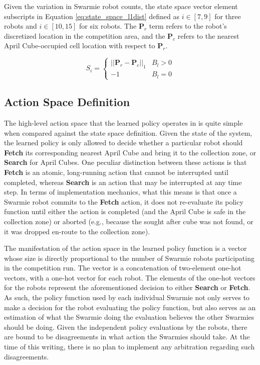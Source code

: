 \documentclass[sigconf,authordraft]{acmart}
\begin{document}
Given the variation in Swarmie robot counts, the state space vector element subscripts in Equation \ref{eq:state_space_l1dist} defined as $i \in [7,9]$ for three robots and $i \in [10,15]$ for six robots. The $\textbf{P}_r$ term refers to the robot's discretized location in the competition area, and the $\textbf{P}_c$ refers to the nearest April Cube-occupied cell location with respect to $\textbf{P}_r$.

\begin{equation}\label{eq:state_space_l1dist}
  S_i =
    \begin{cases}
      ||\textbf{P}_r - \textbf{P}_c||_1 & B_l > 0 \\
      -1 & B_l = 0
    \end{cases}
\end{equation}

\subsection{Action Space Definition}\label{subsec:action_space}
The high-level action space that the learned policy operates in is quite simple when compared against the state space definition. Given the state of the system, the learned policy is only allowed to decide whether a particular robot should \textbf{Fetch} its corresponding nearest April Cube and bring it to the collection zone, or \textbf{Search} for April Cubes. One peculiar distinction between these actions is that \textbf{Fetch} is an atomic, long-running action that cannot be interrupted until completed, whereas \textbf{Search} is an action that may be interrupted at any time step. In terms of implementation mechanics, what this means is that once a Swarmie robot commits to the \textbf{Fetch} action, it does not re-evaluate its policy function until either the action is completed (and the April Cube is safe in the collection zone) or aborted (e.g., because the sought after cube was not found, or it was dropped en-route to the collection zone).

The manifestation of the action space in the learned policy function is a vector whose size is directly proportional to the number of Swarmie robots participating in the competition run. The vector is a concatenation of two-element one-hot vectors, with a one-hot vector for each robot. The elements of the one-hot vectors for the robots represent the aforementioned decision to either \textbf{Search} or \textbf{Fetch}. As such, the policy function used by each individual Swarmie not only serves to make a decision for the robot evaluating the policy function, but also serves as an estimation of what the Swarmie doing the evaluation believes the other Swarmies should be doing. Given the independent policy evaluations by the robots, there are bound to be disagreements in what action the Swarmies should take. At the time of this writing, there is no plan to implement any arbitration regarding such disagreements.
\end{document}
